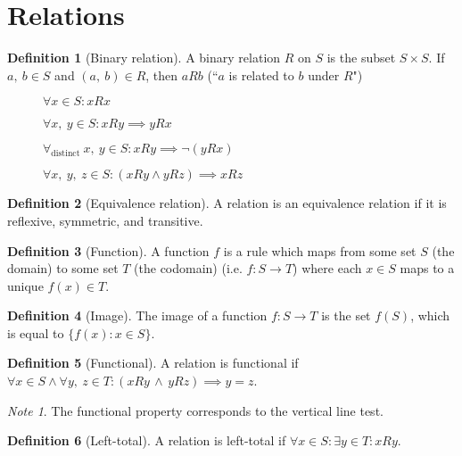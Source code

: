 \documentclass{article}
\theoremstyle{plain}
\numberwithin{theorem}{subsection}
\theoremstyle{definition}
\newtheorem{definition}{Definition}[section]
\numberwithin{definition}{subsection}
\theoremstyle{remark}
\newtheorem{note}{Note}[section]
\numberwithin{note}{section}
\begin{document}
\section{Relations}
\begin{definition}[Binary relation]
	A binary relation $R$ on $S$ is the subset $S\times S$.
	If $a, \: b \in S$ and  $(a, \: b) \in R$,
	then $aRb$ (``$a$ is related to $b$ under $R$")
\end{definition}
%
\begin{figure}[H]
\begin{mdframed}[style=exampledefault,frametitle={Relation Properties}]
\begin{description}[style=sameline]
	\item[Reflexive:]
		$\forall x \in S : xRx$
	\item[Symmetric:]
		$\forall x,\: y \in S : xRy \implies yRx$
	\item[Antisymmetric:]
		$\forall_\text{distinct} \: x,\: y \in S : xRy \implies \neg (yRx)$
	\item[Transitive:]
		$\forall x,\: y, \: z \in S : (xRy \land yRz) \implies xRz$
\end{description}
\end{mdframed}
\end{figure}
%
\begin{definition}[Equivalence relation]
    A relation is an equivalence relation if it is
    reflexive, symmetric, and transitive.
\end{definition}
\begin{definition}[Function]
    A function $f$ is a rule which maps
    from some set $S$ (the domain)
    to some set $T$ (the codomain)
    (i.e. $f: S \to T$) where each $x \in S$ maps to a unique $f(x) \in T$.
\end{definition}
\begin{definition}[Image]
    The image of a function $f: S \to T$ is the set $f(S)$,
    which is equal to $\{f(x):x \in S\}$.
\end{definition}
\begin{definition}[Functional]
    A relation is functional if
    $\forall x \in S \land \forall y,\: z \in T
        : (xRy \, \land \, yRz) \implies y=z$.
\end{definition}
\begin{note}
    The functional property corresponds to the vertical line test.
\end{note}
\begin{definition}[Left-total]
    A relation is left-total if
    $\forall x \in S : \exists y \in T : xRy$.
\end{definition}
\end{document}
